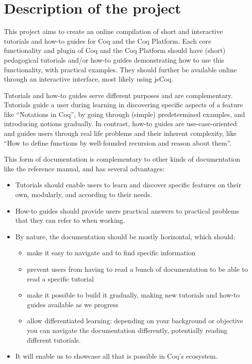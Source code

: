\documentclass{easychair}
\begin{document}
\section{Description of the project}

This project aims to create an online compilation of short and interactive
tutorials and how-to guides for Coq and the Coq Platform.
Each core functionality and plugin of Coq and the Coq Platform should have
(short) pedagogical tutorials and/or how-to guides demonstrating how to use this
functionality, with practical examples. They should further be available online
through an interactive interface, most likely using jsCoq.

Tutorials and how-to guides serve different purposes and are complementary.
Tutorials guide a user during learning in discovering specific aspects of a
feature like ``Notations in Coq'', by going through (simple) predetermined
examples, and introducing notions gradually. In contrast, how-to guides are
use-case-oriented and guides users through real life problems and their inherent
complexity, like ``How to define functions by well-founded recursion and reason
about them''.

This form of documentation is complementary to other kinds of documentation like
the reference manual, and has several advantages:

\begin{itemize}[itemsep=0pt]
  \item Tutorials should enable users to learn and discover specific features on
        their own, modularly, and according to their needs.
  \item How-to guides should provide users practical answers to practical problems
        that they can refer to when working.
  \item By nature, the documentation should be mostly horizontal, which should:
    \begin{itemize}[itemsep=0pt]
      \item make it easy to navigate and to find specific information
      \item prevent users from having to read a bunch of documentation to be
	    able to read a specific tutorial
      \item make it possible to build it gradually, making new tutorials and
	    how-to guides available as we progress
      \item allow differentiated learning: depending on your background or
            objective you can navigate the documentation differently,
            potentially reading different tutorials.
    \end{itemize}
  \item It will enable us to showcase all that is possible in Coq's ecosystem.
\end{itemize}
\end{document}
